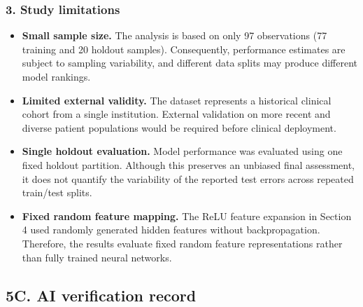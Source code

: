 \documentclass[
  11pt,
]{article}
\begin{document}
\subsubsection{3. Study limitations}\label{study-limitations}

\begin{itemize}
\item
  \textbf{Small sample size.} The analysis is based on only 97
  observations (77 training and 20 holdout samples). Consequently,
  performance estimates are subject to sampling variability, and
  different data splits may produce different model rankings.
\item
  \textbf{Limited external validity.} The dataset represents a
  historical clinical cohort from a single institution. External
  validation on more recent and diverse patient populations would be
  required before clinical deployment.
\item
  \textbf{Single holdout evaluation.} Model performance was evaluated
  using one fixed holdout partition. Although this preserves an unbiased
  final assessment, it does not quantify the variability of the reported
  test errors across repeated train/test splits.
\item
  \textbf{Fixed random feature mapping.} The ReLU feature expansion in
  Section 4 used randomly generated hidden features without
  backpropagation. Therefore, the results evaluate fixed random feature
  representations rather than fully trained neural networks.
\end{itemize}

\subsection{5C. AI verification record}\label{c.-ai-verification-record}
\end{document}
